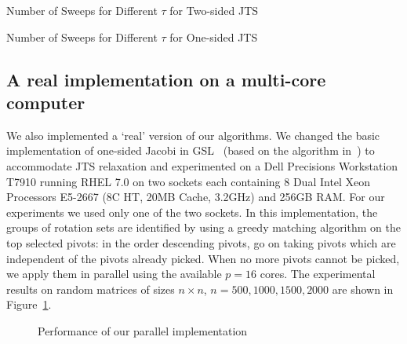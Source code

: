 \documentclass[10pt, conference, compsocconf]{IEEEtran}
\begin{document}
\begin{table}
  \centering
  \caption{Number of Sweeps for Different $\tau$ for Two-sided JTS}
  \label{tab:varyktwo}
  
\end{table}


\begin{table}
  \centering
  \caption{Number of Sweeps for Different $\tau$ for One-sided JTS}
  \label{tab:varykone}
  
\end{table}


\subsection{A real implementation on a multi-core computer}

We also implemented a `real' version of our algorithms. We changed the basic implementation of one-sided Jacobi in GSL~\cite{galassi1996gnu} (based on the algorithm in~\cite{nash1975one}) to accommodate JTS relaxation and experimented on a Dell Precisions Workstation T7910 running RHEL 7.0 on two sockets each containing 8 Dual Intel Xeon Processors E5-2667 (8C HT, 20MB Cache, 3.2GHz) and 256GB RAM. For our experiments we used only one of the two sockets. In this implementation, the groups of rotation sets are identified by using a greedy matching algorithm on the top selected pivots: in the order descending pivots, go on taking pivots which are independent of the pivots already picked. When no more pivots cannot be picked, we apply them in parallel using the available $p=16$ cores. The experimental results on random matrices of sizes $n \times n$, $n=500, 1000, 1500, 2000$ are shown in Figure~\ref{fig:real}.


\begin{figure}[!htb]
\centering
{} \hfill
{}
\caption{Performance of our parallel implementation}
\label{fig:real}
\end{figure}
\end{document}
